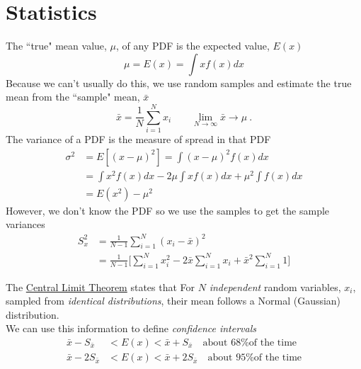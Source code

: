 \documentclass[12pt]{article}
\begin{document}
\section*{Statistics}
The ``true" mean value, $\mu$, of any PDF is the expected value, $E(x)$
\[
\mu = E(x) = \int x f(x) dx
\]
Because we can't usually do this, we use random samples and estimate the true mean from the ``sample" mean, $\bar{x}$
\[
\bar{x} = \frac{1}{N}\sum_{i=1}^N x_i \qquad \lim_{N \to \infty} \bar{x} \rightarrow \mu\:.
\]
The variance of a PDF is the measure of spread in that PDF
\begin{align*}
\sigma^2 &= E[(x - \mu)^2] = \int (x - \mu)^2 f(x) dx \\
&= \int x^2 f(x) dx - 2 \mu \int x f(x) dx + \mu^2 \int f(x) dx\\
&= E(x^2) - \mu^2
\end{align*}
%
However, we don't know the PDF so we use the samples to get the sample variances
\begin{align*}
S_x^2 &= \frac{1}{N-1}\sum_{i=1}^N (x_i - \bar{x})^2 \\
&= \frac{1}{N-1} \biggl[\sum_{i=1}^N x_i^2 - 2 \bar{x}\sum_{i=1}^N x_i + \bar{x}^2 \sum_{i=1}^N 1 \biggr] 
\end{align*}

The \underline{Central Limit Theorem} states that
For $N$ \textit{independent} random variables, $x_i$, sampled from \textit{identical distributions}, their mean follows a Normal (Gaussian) distribution.\\
We can use this information to define \textit{confidence intervals}
\begin{align*}
\bar{x} - S_{\bar{x}} &< E(x) < \bar{x} + S_{\bar{x}} \quad \text{about 68\% of the time}\\
\bar{x} - 2S_{\bar{x}} &< E(x) < \bar{x} + 2S_{\bar{x}} \quad \text{about 95\% of the time}
\end{align*}
\end{document}
